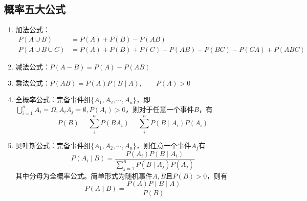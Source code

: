 \subsection{概率五大公式}
\begin{enumerate}[(1)]
    \item 加法公式：
          \begin{align*}
              P(A\cup B)       & = P(A)+P(B)-P(AB)                         \\
              P(A\cup B\cup C) & = P(A)+P(B)+P(C)-P(AB)-P(BC)-P(CA)+P(ABC)
          \end{align*}
    \item 减法公式：$ P(A-B)=P(A)-P(AB) $
    \item 乘法公式：$ P(AB) = P(A)P(B\mid A),\qquad P(A)>0  $
    \item 全概率公式：完备事件组$\{A_1,A_2,\cdots,A_n \}$，即$\bigcup_{i=1}^n A_i = \Omega, A_iA_j = \emptyset, P(A_i)>0$，则对于任意一个事件$B$，有
          \[ P(B) = \sum_i^n P(BA_i) = \sum_i^n P(B\mid A_i)P(A_i) \]
    \item 贝叶斯公式：完备事件组$\{A_1,A_2,\cdots,A_n \}$，则任意一个事件$A_j$有
          \[ P(A_i\mid B) = \frac{P(A_i)P(B\mid A_i)}{\sum_{j=1}^n P(B\mid A_j)P(A_j)} \]
          其中分母为全概率公式。简单形式为随机事件$A,B$且$P(B)>0$，则有
          \[ P(A\mid B) = \frac{P(A)P(B \mid A)}{P(B)} \]
\end{enumerate}

